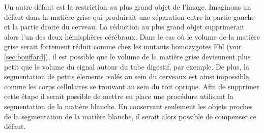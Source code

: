 \documentclass[\main/main.tex]{subfiles}
\begin{document}
%
Un autre défaut est la restriction au plus grand objet de l'image.
%
Imaginons un défaut dans la matière grise qui produirait une séparation entre la partie gauche et la partie droite du cerveau.
%
La réduction au plus grand objet supprimerait alors l'un des deux hémisphères cérébraux.
%
Dans le cas où le volume de la matière grise serait fortement réduit comme chez les mutants homozygotes Fbl (voir \autoref{sec:bouffard}),
il est possible que le volume de la matière grise deviennent plus petit que le volume du signal autour du tube digestif, par exemple.
%
De plus, la segmentation de petits élements isolés au sein du cerveaux est ainsi impossible, comme les corps cellulaires se trouvant au sein du toit optique.
%
Afin de supprimer cette étape il serait possible de mettre en place une procédure utilisant la segmentation de la matière blanche.
%
En conservant seulement les objets proches de la segmentation de la matière blanche, il serait alors possible de compenser ce défaut.
\end{document}
